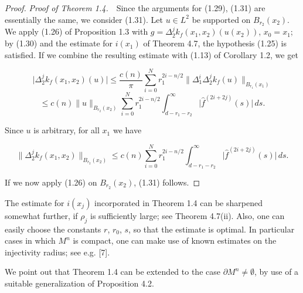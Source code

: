 \begin{proof}
\textit{Proof of Theorem 1.4.}\ \ Since the arguments for (1.29), (1.31) are
essentially the same, we consider (1.31). Let $u \in L^2$ be supported on
$B_{r_2}(x_2)$. We apply (1.26) of Proposition 1.3 with
$g = \Delta_2^j k_f(x_1,x_2)(u(x_2))$, $x_0 = x_1$; by (1.30) and the estimate
for $i(x_1)$ of Theorem 4.7, the hypothesis (1.25) is satisfied. If we combine
the resulting estimate with (1.13) of Corollary 1.2, we get

\begin{equation}\tag{1.32}
\bigl|\Delta_2^j k_f(x_1,x_2)(u)\bigr| \leq \frac{c(n)}{\pi}\sum_{i=0}^N r_1^{2i-n/2}
\bigl\|\Delta_1^i \Delta_2^j k_f(u)\bigr\|_{B_{r_1}(x_1)}
\end{equation}
\[
\leq c(n)\|u\|_{B_{r_2}(x_2)} \sum_{i=0}^N r_1^{2i-n/2}
\int_{d-r_1-r_2}^\infty \bigl|\hat f^{(2i+2j)}(s)\bigr|\,ds.
\]

Since $u$ is arbitrary, for all $x_1$ we have

\begin{equation}\tag{1.33}
\bigl\|\Delta_2^j k_f(x_1,x_2)\bigr\|_{B_{r_2}(x_2)}
\leq c(n)\sum_{i=0}^N r_1^{2i-n/2} \int_{d-r_1-r_2}^\infty \bigl|\hat f^{(2i+2j)}(s)\bigr|\,ds.
\end{equation}

If we now apply (1.26) on $B_{r_2}(x_2)$, (1.31) follows.
\end{proof}

\begin{remark}
\label{rem:sectional-curvature-kernel-estimate}

The estimate for $i(x_j)$ incorporated in Theorem 1.4 can be sharpened
somewhat further, if $\rho_j$ is sufficiently large; see Theorem 4.7(ii). Also,
one can easily choose the constants $r$, $r_0$, $s$, so that the estimate is
optimal. In particular cases in which $M^n$ is compact, one can make use of
known estimates on the injectivity radius; see e.g. [7].
\end{remark}

We point out that Theorem 1.4 can be extended to the case $\partial M^n \neq \emptyset$, by
use of a suitable generalization of Proposition 4.2.
